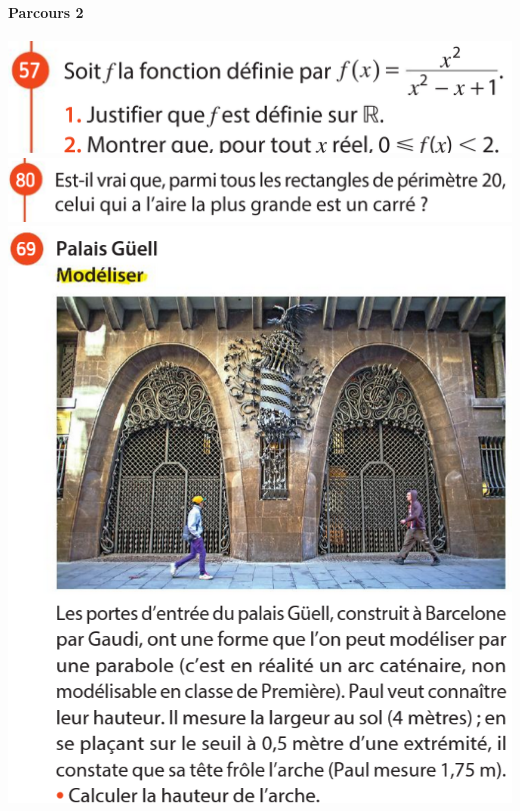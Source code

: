 \documentclass{article}
\begin{document}
\hfill
\begin{minipage}{0.45\textwidth}
\paragraph{Parcours 2}\hfill

\includegraphics[width=\textwidth]{Exercice_2.png}
\includegraphics[width=\textwidth]{Exercice_6.png}
\includegraphics[width=\textwidth]{Exercice_5.png}
\end{minipage}
\hfill
\end{document}
